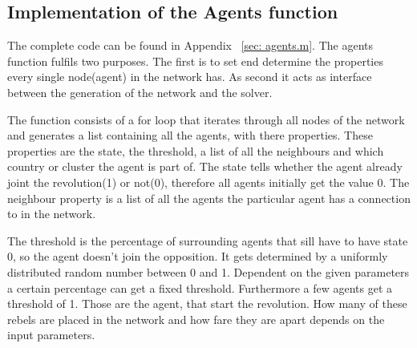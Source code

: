 
\subsection{Implementation of the Agents function}
\label{sec: ImplementAgents }

The complete \matlab code can be found in Appendix ~\ref{sec: agents.m}. The agents function fulfils two purposes. The first is to set end determine the properties every single node(agent) in the network has. As second it acts as interface between the generation of the network and the solver. 

The function consists of a for loop that iterates through all nodes of the network and generates a list containing all the agents, with there properties. These properties are the state, the threshold, a list of all the neighbours and which country or cluster the agent is part of. The state tells whether the agent already joint the revolution(1) or not(0), therefore all agents initially get the value 0. The neighbour property is a list of all the agents the particular agent has a connection to in the network. 

The threshold is the percentage of surrounding agents that sill have to have state 0, so the agent doesn't join the opposition. It gets determined by a  uniformly distributed random number between 0 and 1. Dependent on the given parameters a certain percentage can get a fixed threshold. Furthermore a few agents get a threshold of 1. Those are the agent, that start the revolution. How many of these rebels are placed in the network and how fare they are apart depends on the input parameters. 

